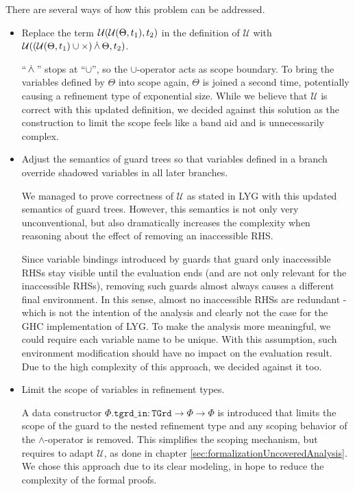 There are several ways of how this problem can be addressed.
\begin{itemize}
    \item Replace the term $\mathcal{U}(\mathcal{U}(\Theta, t_1), t_2)$ in the definition of $\mathcal{U}$ with $\mathcal{U}((\mathcal{U}(\Theta, t_1) \cup \times) \,\dot{\wedge}\, \Theta, t_2)$.
    
        ``$\,\dot{\wedge}\,$'' stops at ``$\cup$'', so the $\cup$-operator acts as scope boundary.
        To bring the variables defined by $\Theta$ into scope again, $\Theta$ is joined a second time, potentially causing a refinement type of exponential size.
        While we believe that $\mathcal{U}$ is correct with this updated definition,
        we decided against this solution as the construction to limit the scope feels like a band aid and is unnecessarily complex.
    
    \item Adjust the semantics of guard trees so that variables defined in a branch override shadowed variables in all later branches.
    
        We managed to prove correctness of $\mathcal{U}$ as stated in LYG with this updated semantics of guard trees.
        However, this semantics is not only very unconventional, but also dramatically increases the complexity
        when reasoning about the effect of removing an inaccessible RHS.
        
        Since variable bindings introduced by guards that guard only inaccessible RHSs stay visible
        until the evaluation ends (and are not only relevant for the inaccessible RHSs),
        removing such guards almost always causes a different final environment.
        In this sense, almost no inaccessible RHSs are redundant - which is not the intention of the analysis and clearly not the case for the GHC implementation of LYG. To make the analysis more meaningful, we could require each variable name to be unique.
        With this assumption, such environment modification should have no impact on the evaluation result.
        Due to the high complexity of this approach, we decided against it too.
    
    \item Limit the scope of variables in refinement types.
    
        A data constructor $\mathtt{Φ.tgrd\_in}:
        \mathtt{TGrd} \to Φ \to Φ$ is introduced that limits the scope of the guard to the nested refinement type and any scoping behavior of the $\land$-operator is removed.
        This simplifies the scoping mechanism, but requires to adapt $\mathcal{U}$, as done in chapter \ref{sec:formalizationUncoveredAnalysis}.
        We chose this approach due to its clear modeling, in hope to reduce the complexity of the formal proofs.
        
\end{itemize}

